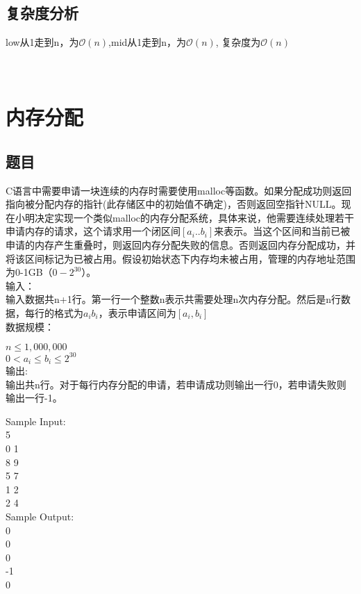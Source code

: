 \documentclass[UTF8]{ctexart}
\begin{document}
\subsection{复杂度分析}
low从1走到n，为$\mathcal{O}(n)$,mid从1走到n，为$\mathcal{O}(n)$, 复杂度为$\mathcal{O}(n)$\\
\\
\\

\section{内存分配}
\subsection{题目}
C语言中需要申请一块连续的内存时需要使用malloc等函数。如果分配成功则返回指向被分配内存的指针(此存储区中的初始值不确定)，否则返回空指针NULL。现在小明决定实现一个类似malloc的内存分配系统，具体来说，他需要连续处理若干申请内存的请求，这个请求用一个闭区间$[a_i..b_i]$来表示。当这个区间和当前已被申请的内存产生重叠时，则返回内存分配失败的信息。否则返回内存分配成功，并将该区间标记为已被占用。假设初始状态下内存均未被占用，管理的内存地址范围为0-1GB（$0-2^{30}$）。\\

输入：\\
输入数据共n+1行。第一行一个整数n表示共需要处理n次内存分配。然后是n行数据，每行的格式为$a_i b_i$，表示申请区间为$[a_i,b_i]$\\

数据规模：

$n\leq 1,000,000$\\
$0<a_i\leq b_i \leq 2^{30}$\\

输出:\\
输出共n行。对于每行内存分配的申请，若申请成功则输出一行0，若申请失败则输出一行-1。

Sample Input:\\
5\\
0 1\\
8 9\\
5 7\\
1 2\\
2 4\\

Sample Output:\\
0\\
0\\
0\\
-1\\
0\\
\end{document}
